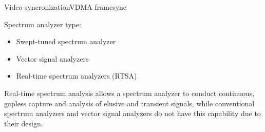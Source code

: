 \begin{frame}{Video syncronization}{VDMA framesync}
	\begin{block}{Spectrum analyzer type:}
		\begin{itemize}
			\item Swept-tuned spectrum analyzer
			\item Vector signal analyzers
			\item Real-time spectrum analyzers (RTSA)
		\end{itemize}
	\end{block}
	\pause
	\begin{block}{}
		Real-time spectrum analysis allows a spectrum analyzer to conduct continuous,
		gapless capture and analysis of elusive and transient signals, while conventional
		spectrum analyzers and vector signal analyzers do not have this capability due to their design.
	\end{block}
\end{frame}
